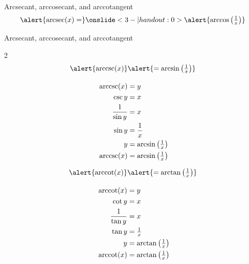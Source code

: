 \begin{frame}[t]{Arcsecant, arccosecant, and arccotangent}\color{C1}
\[\alert{\text{arcsec}(x)=}\onslide<3-|handout:0>{\alert{\arccos\left(\tfrac1x\right)}}\]\pause
{}

\end{frame}

\begin{frame}[t]{Arcsecant, arccosecant, and arccotangent}
\vspace{-1cm}
\begin{multicols}{2}
\color{C2}
\begin{align*}
\alert{\text{arccsc}(x)}&\alert{=\arcsin\left(\tfrac1x\right)}\\[1em]
\text{arccsc}(x)&=y\\
\csc y &= x\\
\frac{1}{\sin y}&=x\\
\sin y &= \frac1x\\
y&=\arcsin\left(\tfrac1x\right)\\
\text{arccsc}(x)&=\arcsin\left(\tfrac1x\right)
\end{align*}\columnbreak


\color{C3}
\begin{align*}
\alert{\text{arccot}(x)}&\alert{=\arctan\left( \tfrac{1}{x}\right)}\\[1em]
\text{arccot}(x)&=y\\
\cot y &= x\\
\frac{1}{\tan y}&=x\\
\tan y &= \tfrac1x\\
y&=\arctan\left(\tfrac1x\right)\\
\text{arccot}(x)&=\arctan\left(\tfrac1x\right)
\end{align*}
\end{multicols}

\end{frame}

